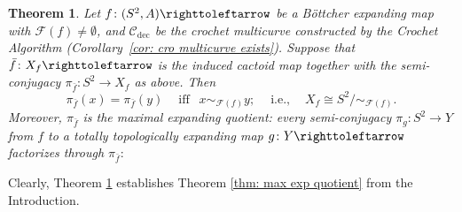 \documentclass{amsart}
\theoremstyle{plain}
\newtheorem{theorem}{Theorem}[section]
\theoremstyle{definition}
\theoremstyle{remark}
\newcommand{\reminder}[1]{\textsl{$\lhd\rhd$#1$\lhd\rhd$}\marginpar{$\lhd\rhd\lhd\rhd\lhd\rhd$}}%
\newcommand{\hide}[1]{}
\renewcommand{\sp}{{\ \ }}
\newcommand{\Fat}{{\mathcal F}}
\newcommand{\CC}{{\mathcal C}}
\newcommand\selfmap{\righttoleftarrow}
\newcommand{\cro}{{\operatorname{dec}}}
\begin{document}
\smallskip

\begin{theorem}
\label{thm:MEQ}
Let $f\colon (S^2,A)\selfmap$ be a B\"ottcher expanding  map with $\Fat(f)\not=\emptyset$, and $\CC_\cro$ be the crochet multicurve constructed by the Crochet Algorithm (Corollary~\ref{cor: cro multicurve exists}). Suppose that $\bar f\colon X_f\selfmap$ is the induced cactoid map %
together with the semi-conjugacy $\pi_{\bar f} \colon S^2\to X_f$ as above. Then 
\begin{equation}
\label{eq:thm:MEQ}
\pi_{\bar f}  (x)=\pi_{\bar f} (y)\sp\sp\text{ iff }\sp x\sim_{\Fat(f)} y; \sp\sp \text{ i.e., }\sp\sp X_f\cong S^2/\sim_{\Fat(f)}.
\end{equation}
Moreover, $\pi_{\bar f} $ is the maximal expanding quotient: every  semi-conjugacy $\pi_g\colon S^2\to Y$ from $f$ to a totally topologically expanding map $g\colon Y\selfmap$ factorizes through $\pi_{\bar f} :$

\begin{center}
\end{center} 
\end{theorem}


Clearly, Theorem \ref{thm:MEQ} establishes Theorem \ref{thm: max exp quotient} from the Introduction.
\end{document}
